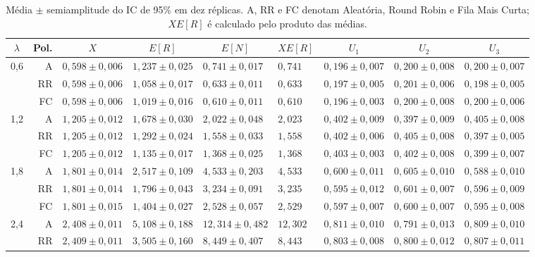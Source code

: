 \documentclass[conference,a4paper]{IEEEtran}
\begin{document}
\begin{table}[t]
\caption{Média $\pm$ semiamplitude do IC de 95\% em dez réplicas. A, RR e FC
denotam Aleatória, Round Robin e Fila Mais Curta; $X E[R]$ é calculado pelo
produto das médias.}
\label{tab:simulacao}
\centering
\scriptsize
\renewcommand{\arraystretch}{0.95}
\setlength{\tabcolsep}{2.2pt}
\begin{tabular}{@{}rrlllllll@{}}
\toprule
\multicolumn{1}{c}{$\lambda$} & \multicolumn{1}{c}{Pol.} &
\multicolumn{1}{c}{$X$} & \multicolumn{1}{c}{$E[R]$} &
\multicolumn{1}{c}{$E[N]$} & \multicolumn{1}{c}{$XE[R]$} &
\multicolumn{1}{c}{$U_1$} & \multicolumn{1}{c}{$U_2$} &
\multicolumn{1}{c}{$U_3$} \\
\midrule
0,6 & A  & $0,598\pm0,006$ & $1,237\pm0,025$ & $0,741\pm0,017$ & $0,741$ & $0,196\pm0,007$ & $0,200\pm0,008$ & $0,200\pm0,007$ \\
    & RR & $0,598\pm0,006$ & $1,058\pm0,017$ & $0,633\pm0,011$ & $0,633$ & $0,197\pm0,005$ & $0,201\pm0,006$ & $0,198\pm0,005$ \\
    & FC & $0,598\pm0,006$ & $1,019\pm0,016$ & $0,610\pm0,011$ & $0,610$ & $0,196\pm0,003$ & $0,200\pm0,008$ & $0,200\pm0,006$ \\
1,2 & A  & $1,205\pm0,012$ & $1,678\pm0,030$ & $2,022\pm0,048$ & $2,023$ & $0,402\pm0,009$ & $0,397\pm0,009$ & $0,405\pm0,008$ \\
    & RR & $1,205\pm0,012$ & $1,292\pm0,024$ & $1,558\pm0,033$ & $1,558$ & $0,402\pm0,006$ & $0,405\pm0,008$ & $0,397\pm0,005$ \\
    & FC & $1,205\pm0,012$ & $1,135\pm0,017$ & $1,368\pm0,025$ & $1,368$ & $0,403\pm0,003$ & $0,402\pm0,008$ & $0,399\pm0,007$ \\
1,8 & A  & $1,801\pm0,014$ & $2,517\pm0,109$ & $4,533\pm0,203$ & $4,533$ & $0,600\pm0,011$ & $0,605\pm0,010$ & $0,588\pm0,010$ \\
    & RR & $1,801\pm0,014$ & $1,796\pm0,043$ & $3,234\pm0,091$ & $3,235$ & $0,595\pm0,012$ & $0,601\pm0,007$ & $0,596\pm0,009$ \\
    & FC & $1,801\pm0,015$ & $1,404\pm0,027$ & $2,528\pm0,057$ & $2,529$ & $0,597\pm0,007$ & $0,600\pm0,007$ & $0,595\pm0,008$ \\
2,4 & A  & $2,408\pm0,011$ & $5,108\pm0,188$ & $12,314\pm0,482$ & $12,302$ & $0,811\pm0,010$ & $0,791\pm0,013$ & $0,809\pm0,010$ \\
    & RR & $2,409\pm0,011$ & $3,505\pm0,160$ & $8,449\pm0,407$ & $8,443$ & $0,803\pm0,008$ & $0,800\pm0,012$ & $0,807\pm0,011$ \\

\end{tabular}
\end{table}
\end{document}
